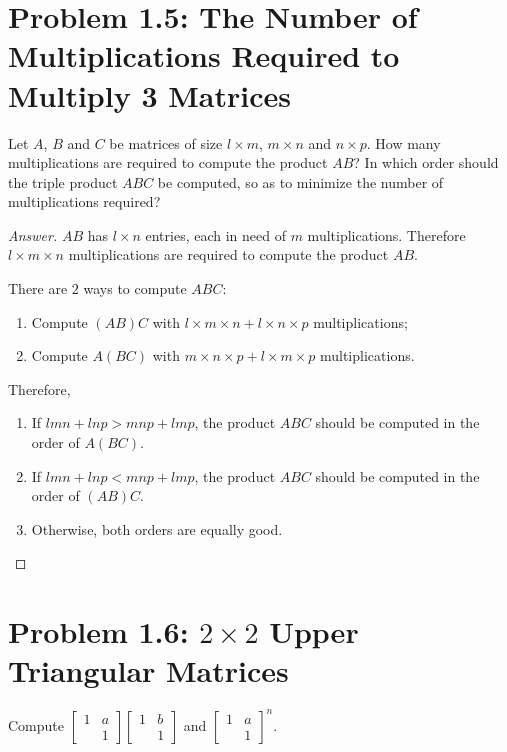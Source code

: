 \documentclass{amsbook}
\theoremstyle{definition}
\theoremstyle{remark}
\numberwithin{section}{chapter}
\numberwithin{equation}{chapter}
\begin{document}
\section{Problem 1.5: The Number of Multiplications Required to Multiply 3 Matrices}

Let $A$, $B$ and $C$ be matrices of size $l\times m$, $m\times n$ and $n\times p$. How many multiplications are required to compute the product $AB$? In which order should the triple product $ABC$ be computed, so as to minimize the number of multiplications required?

\begin{proof}[Answer]
$AB$ has $l\times n$ entries, each in need of $m$ multiplications. Therefore $l\times m\times n$ multiplications are required to compute the product $AB$.

There are $2$ ways to compute $ABC$:

\begin{enumerate}
\item Compute $(AB)C$ with $l\times m\times n + l\times n\times p$ multiplications;
\item Compute $A(BC)$ with $m\times n\times p + l\times m\times p$ multiplications.
\end{enumerate}

Therefore,

\begin{enumerate}
\item If $lmn+lnp>mnp+lmp$, the product $ABC$ should be computed in the order of $A(BC)$.
\item If $lmn+lnp<mnp+lmp$, the product $ABC$ should be computed in the order of $(AB)C$.
\item Otherwise, both orders are equally good.
\end{enumerate}
\end{proof}

\section{Problem 1.6: $2\times2$ Upper Triangular Matrices}

Compute $\begin{bmatrix}
1 &a\\
   &1\end{bmatrix}\begin{bmatrix}
1 &b\\
   &1\end{bmatrix}$ and $\begin{bmatrix}
1 &a\\
   &1\end{bmatrix}^n$.
\end{document}

